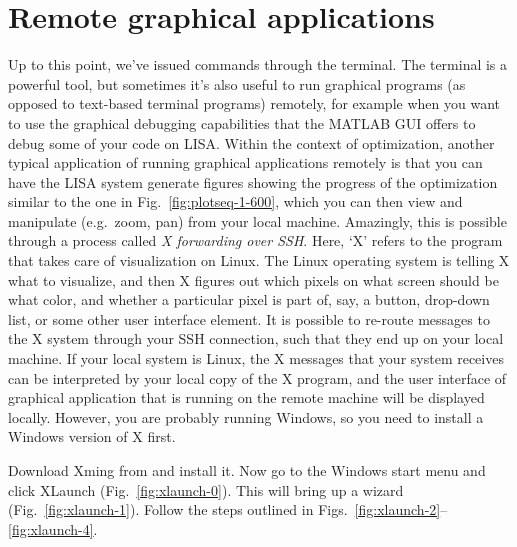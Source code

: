 \chapter{Remote graphical applications}



Up to this point, we've issued commands through the terminal.  The terminal is a powerful tool, but sometimes it's also useful to run graphical programs (as opposed to text-based terminal programs) remotely, for example when you want to use the graphical debugging capabilities that the MATLAB GUI offers to debug some of your code on LISA. Within the context of optimization, another typical application of running graphical applications remotely is that you can have the LISA system generate figures showing the progress of the optimization similar to the one in Fig.~\ref{fig:plotseq-1-600}, which you can then view and manipulate (e.g.~zoom, pan) from your local machine. Amazingly, this is possible through a process called \textit{X forwarding over SSH}. Here, `X' refers to the program that takes care of visualization on Linux. The Linux operating system is telling X what to visualize, and then X figures out which pixels on what screen should be what color, and whether a particular pixel is part of, say, a button, drop-down list, or some other user interface element. It is possible to re-route messages to the X system through your SSH connection, such that they end up on your local machine. If your local system is Linux, the X messages that your system receives can be interpreted by your local copy of the X program, and the user interface of graphical application that is running on the remote machine will be displayed locally. However, you are probably running Windows, so you need to install a Windows version of X first. 

Download Xming from  and install it. Now go to the Windows start menu and click XLaunch (Fig.~\ref{fig:xlaunch-0}). This will bring up a wizard (Fig.~\ref{fig:xlaunch-1}). Follow the steps outlined in Figs.~\ref{fig:xlaunch-2}--\ref{fig:xlaunch-4}. 

